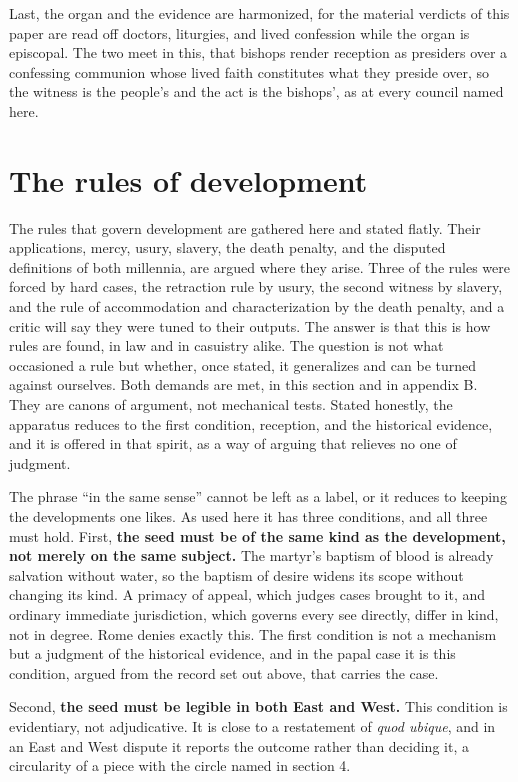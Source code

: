 \documentclass[11pt,twoside]{article}
\newcommand{\unit}[1]{\needspace{3\baselineskip}\par\medskip{\normalfont\bfseries\color{subhead}#1}\par\nobreak\smallskip}
\begin{document}
Last, the organ and the evidence are harmonized, for the material verdicts of this paper are read off doctors, liturgies, and lived confession while the organ is episcopal. The two meet in this, that bishops render reception as presiders over a confessing communion whose lived faith constitutes what they preside over, so the witness is the people's and the act is the bishops', as at every council named here.

\section{The rules of development}

The rules that govern development are gathered here and stated flatly. Their applications, mercy, usury, slavery, the death penalty, and the disputed definitions of both millennia, are argued where they arise. Three of the rules were forced by hard cases, the retraction rule by usury, the second witness by slavery, and the rule of accommodation and characterization by the death penalty, and a critic will say they were tuned to their outputs. The answer is that this is how rules are found, in law and in casuistry alike. The question is not what occasioned a rule but whether, once stated, it generalizes and can be turned against ourselves. Both demands are met, in this section and in appendix B. They are canons of argument, not mechanical tests. Stated honestly, the apparatus reduces to the first condition, reception, and the historical evidence, and it is offered in that spirit, as a way of arguing that relieves no one of judgment.

\unit{The test of expansion.}
The phrase ``in the same sense'' cannot be left as a label, or it reduces to keeping the developments one likes. As used here it has three conditions, and all three must hold. First, \textbf{the seed must be of the same kind as the development, not merely on the same subject.} The martyr's baptism of blood is already salvation without water, so the baptism of desire widens its scope without changing its kind. A primacy of appeal, which judges cases brought to it, and ordinary immediate jurisdiction, which governs every see directly, differ in kind, not in degree. Rome denies exactly this. The first condition is not a mechanism but a judgment of the historical evidence, and in the papal case it is this condition, argued from the record set out above, that carries the case.

Second, \textbf{the seed must be legible in both East and West.} This condition is evidentiary, not adjudicative. It is close to a restatement of \emph{quod ubique}, and in an East and West dispute it reports the outcome rather than deciding it, a circularity of a piece with the circle named in section 4.
\end{document}
